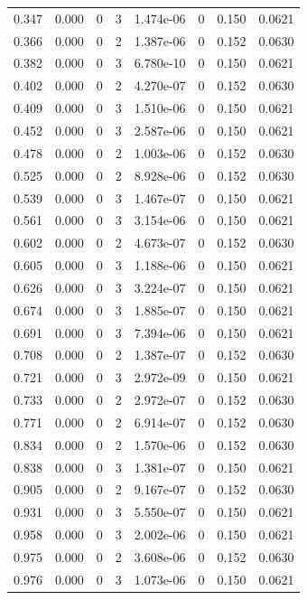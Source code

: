 \documentclass[preview]{standalone}
\begin{document}
{{\begin{tabular}{L{1.2cm}C{1.2cm} C{0.3cm}C{0.5cm} C{1.4cm}C{1.4cm} C{1.4cm}C{1.4cm}}
  0.347  &  0.000  & 0     &  3 &  1.474e-06  & 0  & 0.150 &  0.0621   \\ 
  0.366  &  0.000  & 0     &  2 &  1.387e-06  & 0  & 0.152 &  0.0630   \\ 
  0.382  &  0.000  & 0     &  3 &  6.780e-10  & 0  & 0.150 &  0.0621   \\ 
  0.402  &  0.000  & 0     &  2 &  4.270e-07  & 0  & 0.152 &  0.0630   \\ 
  0.409  &  0.000  & 0     &  3 &  1.510e-06  & 0  & 0.150 &  0.0621   \\ 
  0.452  &  0.000  & 0     &  3 &  2.587e-06  & 0  & 0.150 &  0.0621   \\ 
  0.478  &  0.000  & 0     &  2 &  1.003e-06  & 0  & 0.152 &  0.0630   \\ 
  0.525  &  0.000  & 0     &  2 &  8.928e-06  & 0  & 0.152 &  0.0630   \\ 
  0.539  &  0.000  & 0     &  3 &  1.467e-07  & 0  & 0.150 &  0.0621   \\ 
  0.561  &  0.000  & 0     &  3 &  3.154e-06  & 0  & 0.150 &  0.0621   \\ 
  0.602  &  0.000  & 0     &  2 &  4.673e-07  & 0  & 0.152 &  0.0630   \\ 
  0.605  &  0.000  & 0     &  3 &  1.188e-06  & 0  & 0.150 &  0.0621   \\ 
  0.626  &  0.000  & 0     &  3 &  3.224e-07  & 0  & 0.150 &  0.0621   \\ 
  0.674  &  0.000  & 0     &  3 &  1.885e-07  & 0  & 0.150 &  0.0621   \\ 
  0.691  &  0.000  & 0     &  3 &  7.394e-06  & 0  & 0.150 &  0.0621   \\ 
  0.708  &  0.000  & 0     &  2 &  1.387e-07  & 0  & 0.152 &  0.0630   \\ 
  0.721  &  0.000  & 0     &  3 &  2.972e-09  & 0  & 0.150 &  0.0621   \\ 
  0.733  &  0.000  & 0     &  2 &  2.972e-07  & 0  & 0.152 &  0.0630   \\ 
  0.771  &  0.000  & 0     &  2 &  6.914e-07  & 0  & 0.152 &  0.0630   \\ 
  0.834  &  0.000  & 0     &  2 &  1.570e-06  & 0  & 0.152 &  0.0630   \\ 
  0.838  &  0.000  & 0     &  3 &  1.381e-07  & 0  & 0.150 &  0.0621   \\ 
  0.905  &  0.000  & 0     &  2 &  9.167e-07  & 0  & 0.152 &  0.0630   \\ 
  0.931  &  0.000  & 0     &  3 &  5.550e-07  & 0  & 0.150 &  0.0621   \\ 
  0.958  &  0.000  & 0     &  3 &  2.002e-06  & 0  & 0.150 &  0.0621   \\ 
  0.975  &  0.000  & 0     &  2 &  3.608e-06  & 0  & 0.152 &  0.0630   \\ 
  0.976  &  0.000  & 0     &  3 &  1.073e-06  & 0  & 0.150 &  0.0621   \\ 
\hline 
\end{tabular} 

}}
\end{document}
